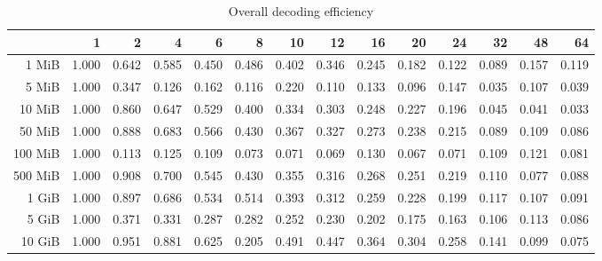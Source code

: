 \begin{centering}
\begin{table}[!h]
	\caption{Overall decoding efficiency}
	\begin{tabular}{rrrrrrrrrrrrrr}
		\toprule
		\diagbox[width=7em]{Sizes}{Threads} & 1  &    2  &    4  &    6  &    8  &    10 &    12 &    16 &    20 &    24 &    32 &    48 &    64 \\
		\midrule
		1 MiB   & 1.000 & 0.642 & 0.585 & 0.450 & 0.486 & 0.402 & 0.346 & 0.245 & 0.182 & 0.122 & 0.089 & 0.157 & 0.119 \\
		5 MiB   & 1.000 & 0.347 & 0.126 & 0.162 & 0.116 & 0.220 & 0.110 & 0.133 & 0.096 & 0.147 & 0.035 & 0.107 & 0.039 \\
		10 MiB  & 1.000 & 0.860 & 0.647 & 0.529 & 0.400 & 0.334 & 0.303 & 0.248 & 0.227 & 0.196 & 0.045 & 0.041 & 0.033 \\
		50 MiB  & 1.000 & 0.888 & 0.683 & 0.566 & 0.430 & 0.367 & 0.327 & 0.273 & 0.238 & 0.215 & 0.089 & 0.109 & 0.086 \\
		100 MiB & 1.000 & 0.113 & 0.125 & 0.109 & 0.073 & 0.071 & 0.069 & 0.130 & 0.067 & 0.071 & 0.109 & 0.121 & 0.081 \\
		500 MiB & 1.000 & 0.908 & 0.700 & 0.545 & 0.430 & 0.355 & 0.316 & 0.268 & 0.251 & 0.219 & 0.110 & 0.077 & 0.088 \\
		1 GiB   & 1.000 & 0.897 & 0.686 & 0.534 & 0.514 & 0.393 & 0.312 & 0.259 & 0.228 & 0.199 & 0.117 & 0.107 & 0.091 \\
		5 GiB   & 1.000 & 0.371 & 0.331 & 0.287 & 0.282 & 0.252 & 0.230 & 0.202 & 0.175 & 0.163 & 0.106 & 0.113 & 0.086 \\
		10 GiB  & 1.000 & 0.951 & 0.881 & 0.625 & 0.205 & 0.491 & 0.447 & 0.364 & 0.304 & 0.258 & 0.141 & 0.099 & 0.075 \\
		\bottomrule
	\end{tabular}
\end{table}


\end{centering}
